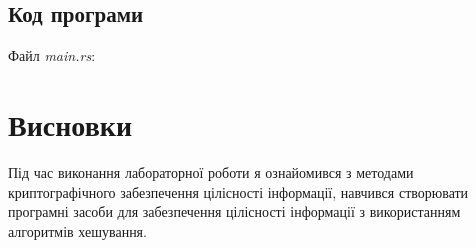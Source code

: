\documentclass[oneside,14pt]{extarticle}
\begin{document}
\begin{normalsize}
	\subsection*{Код програми}
	Файл \textit{main.rs}:
	{\small	}
	
	\section*{Висновки}
	Під час виконання лабораторної роботи я ознайомився з методами криптографічного забезпечення цілісності інформації, навчився створювати програмні засоби для
	забезпечення цілісності інформації з використанням алгоритмів хешування.
	    
\end{normalsize}
\end{document}
